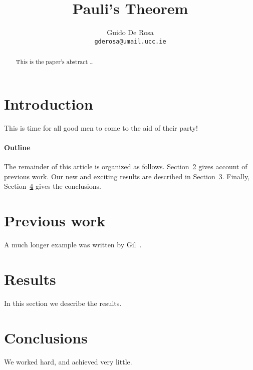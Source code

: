 \documentclass[12pt]{article}
\author{Guido De Rosa \\ \small\tt{gderosa@umail.ucc.ie}}
\title{Pauli's Theorem}
\begin{document}
\maketitle
\begin{abstract}
This is the paper's abstract \ldots
\end{abstract}
\section{Introduction}
This is time for all good men to come to the aid of their party!

\paragraph{Outline}
The remainder of this article is organized as follows.
Section~\ref{previous work} gives account of previous work.
Our new and exciting results are described in Section~\ref{results}.
Finally, Section~\ref{conclusions} gives the conclusions.

\section{Previous work}\label{previous work}
A much longer \LaTeXe{} example was written by Gil~\cite{Gil:02}.

\section{Results}\label{results}
In this section we describe the results.

\section{Conclusions}\label{conclusions}
We worked hard, and achieved very little.



\end{document}

